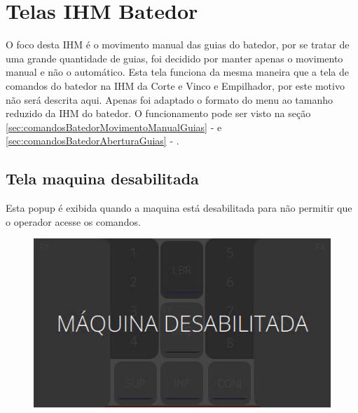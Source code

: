 \thispagestyle{fancy}
\vspace*{40 pt}
\section{\large{Telas IHM Batedor}}
O foco desta IHM é o movimento manual das guias do batedor, por se tratar de uma grande quantidade de guias, foi decidido por manter apenas o movimento manual e não o automático.
Esta tela funciona da mesma maneira que a tela de comandos do batedor na IHM da Corte e Vinco e Empilhador, por este motivo não será descrita aqui. 
Apenas foi adaptado o formato do menu ao tamanho reduzido da IHM do batedor. O funcionamento pode ser visto na seção \ref{sec:comandosBatedorMovimentoManualGuias} - 
e \ref{sec:comandosBatedorAberturaGuias} - .

\subsection{Tela maquina desabilitada}
    Esta popup é exibida quando a maquina está desabilitada para não permitir que o operador acesse os comandos.
\vspace*{\fill}
\begin{figure}[h]
  \centering
  \includegraphics{src/imagesICV/12-KTP400-scout/e-1.png}
\end{figure}
\vspace*{\fill}

\newpage
\thispagestyle{fancy}
\vspace*{40 pt}
